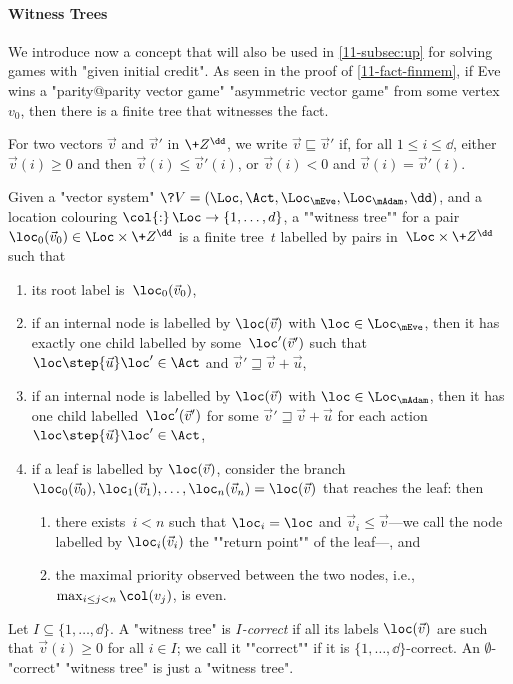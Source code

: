 
\paragraph{Witness Trees}
We introduce now a concept that will also be used in \cref{11-subsec:up}
for solving games with "given initial credit".  As seen in the proof
of \cref{11-fact-finmem}, if Eve wins a "parity@parity vector game"
"asymmetric vector game" from some vertex~$v_0$, then there is a
finite tree that witnesses the fact.

For two vectors $\vec v$ and $\vec v'$ in $\+Z^\dd$, we write $\vec
v\sqsubseteq \vec v'$ if, for all $1\leq i\leq\dd$, either $\vec
v(i)\geq 0$ and then $\vec v(i)\leq\vec v'(i)$, or $\vec v(i)<0$ and
$\vec v(i)=\vec v'(i)$.

\begin{definition}\label{11-def-wt}
  Given a "vector system"
  $\?V=(\Loc,\Act,\Loc_\mEve,\Loc_\mAdam,\dd)$, and a location
  colouring $\col{:}\,\Loc\to\{1,\dots,d\}$, a ""witness tree"" for a
  pair $\loc_0(\vec v_0)\in\Loc\times\+Z^\dd$ is a finite tree~$t$
  labelled by pairs in~$\Loc\times\+Z^\dd$ such that
\begin{enumerate}
\item its root label is~$\loc_0(\vec v_0)$,
\item if an internal node is labelled by $\loc(\vec v)$ with
  $\loc\in\Loc_\mEve$, then it has exactly one child labelled by
  some~$\loc'(\vec v')$ such that $\loc\step{\vec u}\loc'\in\Act$ and
  $\vec v'\sqsupseteq\vec v+\vec u$,
\item if an internal node is labelled by $\loc(\vec v)$ with
  $\loc\in\Loc_\mAdam$, then it has one child labelled~$\loc'(\vec
  v')$ for some $\vec v'\sqsupseteq\vec v+\vec u$ for each action
  $\loc\step{\vec u}\loc'\in\Act$,
\item\label{11-wt-self-even} if a leaf is labelled by $\loc(\vec v)$,
  consider the branch
  $\loc_0(\vec v_0),\loc_1(\vec v_1),\dots,\loc_n(\vec v_n)=\loc(\vec
  v)$ that reaches the leaf: then
  \begin{enumerate}
  \item\label{11-wt-self}there exists~$i<n$ such that
  $\loc_i=\loc$ and $\vec v_i\leq\vec v$---we call the node labelled by
  $\loc_i(\vec v_i)$ the ""return point"" of the leaf---, and
  \item\label{11-wt-even} the maximal priority observed between the two
  nodes, i.e., $\max_{i\leq j<n}\col(v_j)$, is even.
  \end{enumerate}
\end{enumerate}
\AP Let $I\subseteq \{1,\dots,\dd\}$.  A "witness tree" is
\emph{$I$-correct} if all its labels $\loc(\vec v)$ are such that
$\vec v(i)\geq 0$ for all $i\in I$; we call it ""correct"" if it is
$\{1,\dots,\dd\}$-correct.  An $\emptyset$-"correct" "witness tree" is
just a "witness tree".
\end{definition}

